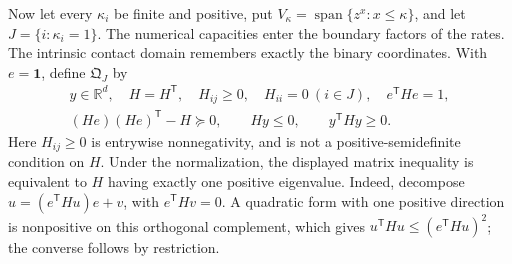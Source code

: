 \documentclass[reqno]{amsart}
\theoremstyle{definition}
\theoremstyle{remark}
\newcommand{\R}{\mathbb R}
\begin{document}
Now let every \(\kappa_i\) be finite and positive, put
\(V_\kappa=\operatorname{span}\{z^x:x\le\kappa\}\), and let
\(J=\{i:\kappa_i=1\}\).  The numerical capacities enter the boundary factors of
the rates.  The intrinsic contact domain remembers exactly the binary coordinates.
With \(e=\boldsymbol1\), define \(\mathfrak Q_J\) by
\begin{equation}\label{pos:contact-domain}
 \begin{gathered}
 y\in\R^d,\quad H=H^{\mathsf T},\quad H_{ij}\ge0,
 \quad H_{ii}=0\ (i\in J),\quad e^{\mathsf T}He=1,\\
 (He)(He)^{\mathsf T}-H\succeq0,\qquad
 Hy\le0,\qquad y^{\mathsf T}Hy\ge0.
 \end{gathered}
\end{equation}
Here \(H_{ij}\ge0\) is entrywise nonnegativity, and is not a positive-semidefinite
condition on \(H\).  Under the normalization, the displayed matrix inequality
is equivalent to \(H\) having exactly one positive eigenvalue.  Indeed, decompose
\(u=(e^{\mathsf T}Hu)e+v\), with \(e^{\mathsf T}Hv=0\).  A quadratic form with
one positive direction is nonpositive on this orthogonal complement, which gives
\(u^{\mathsf T}Hu\le(e^{\mathsf T}Hu)^2\); the converse follows by restriction.
\end{document}
